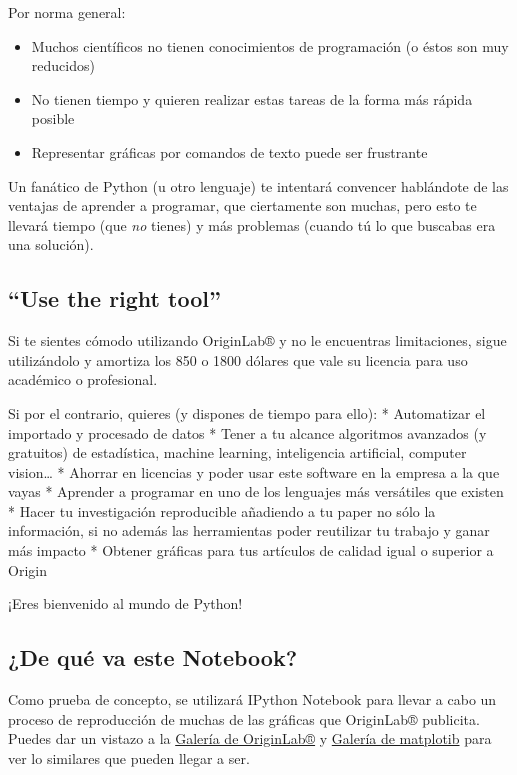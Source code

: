 \documentclass{article}
\begin{document}
Por norma general:

\begin{itemize}
\itemsep1pt\parskip0pt
\item
  Muchos científicos no tienen conocimientos de programación (o éstos
  son muy reducidos)
\item
  No tienen tiempo y quieren realizar estas tareas de la forma más
  rápida posible
\item
  Representar gráficas por comandos de texto puede ser frustrante
\end{itemize}

    Un fanático de Python (u otro lenguaje) te intentará convencer
hablándote de las ventajas de aprender a programar, que ciertamente son
muchas, pero esto te llevará tiempo (que \emph{no} tienes) y más
problemas (cuando tú lo que buscabas era una solución).


    \subsection{``Use the right tool''}


    Si te sientes cómodo utilizando OriginLab® y no le encuentras
limitaciones, sigue utilizándolo y amortiza los 850 o 1800 dólares que
vale su licencia para uso académico o profesional.

Si por el contrario, quieres (y dispones de tiempo para ello): *
Automatizar el importado y procesado de datos * Tener a tu alcance
algoritmos avanzados (y gratuitos) de estadística, machine learning,
inteligencia artificial, computer vision\ldots{} * Ahorrar en licencias
y poder usar este software en la empresa a la que vayas * Aprender a
programar en uno de los lenguajes más versátiles que existen * Hacer tu
investigación reproducible añadiendo a tu paper no sólo la información,
si no además las herramientas poder reutilizar tu trabajo y ganar más
impacto * Obtener gráficas para tus artículos de calidad igual o
superior a Origin

¡Eres bienvenido al mundo de Python!


    \subsection{¿De qué va este Notebook?}


    Como prueba de concepto, se utilizará IPython Notebook para llevar a
cabo un proceso de reproducción de muchas de las gráficas que OriginLab®
publicita. Puedes dar un vistazo a la
\href{http://www.originlab.com/www/products/graphgallery.aspx}{Galería
de OriginLab®} y \href{http://matplotlib.org/gallery.html}{Galería de
matplotib} para ver lo similares que pueden llegar a ser.
\end{document}
